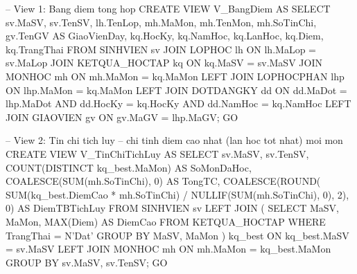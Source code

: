 \documentclass[13pt, a4paper]{article}
\begin{document}
\begin{sqlbox}
-- View 1: Bang diem tong hop
CREATE VIEW V_BangDiem AS
SELECT sv.MaSV, sv.TenSV, lh.TenLop,
       mh.MaMon, mh.TenMon, mh.SoTinChi,
       gv.TenGV AS GiaoVienDay, kq.HocKy, kq.NamHoc, kq.LanHoc,
       kq.Diem, kq.TrangThai
FROM SINHVIEN      sv
JOIN LOPHOC        lh  ON lh.MaLop  = sv.MaLop
JOIN KETQUA_HOCTAP kq  ON kq.MaSV   = sv.MaSV
JOIN MONHOC        mh  ON mh.MaMon  = kq.MaMon
LEFT JOIN LOPHOCPHAN lhp ON lhp.MaMon = kq.MaMon
LEFT JOIN DOTDANGKY  dd  ON dd.MaDot  = lhp.MaDot
                         AND dd.HocKy  = kq.HocKy AND dd.NamHoc = kq.NamHoc
LEFT JOIN GIAOVIEN   gv  ON gv.MaGV   = lhp.MaGV;
GO

-- View 2: Tin chi tich luy -- chi tinh diem cao nhat (lan hoc tot nhat) moi mon
CREATE VIEW V_TinChiTichLuy AS
SELECT sv.MaSV, sv.TenSV,
       COUNT(DISTINCT kq_best.MaMon)                   AS SoMonDaHoc,
       COALESCE(SUM(mh.SoTinChi), 0)                   AS TongTC,
       COALESCE(ROUND(
           SUM(kq_best.DiemCao * mh.SoTinChi)
           / NULLIF(SUM(mh.SoTinChi), 0), 2), 0)       AS DiemTBTichLuy
FROM SINHVIEN sv
LEFT JOIN (
    SELECT MaSV, MaMon, MAX(Diem) AS DiemCao
    FROM KETQUA_HOCTAP WHERE TrangThai = N'Dat'
    GROUP BY MaSV, MaMon
) kq_best ON kq_best.MaSV = sv.MaSV
LEFT JOIN MONHOC mh ON mh.MaMon = kq_best.MaMon
GROUP BY sv.MaSV, sv.TenSV;
GO
\end{sqlbox}
\end{document}
